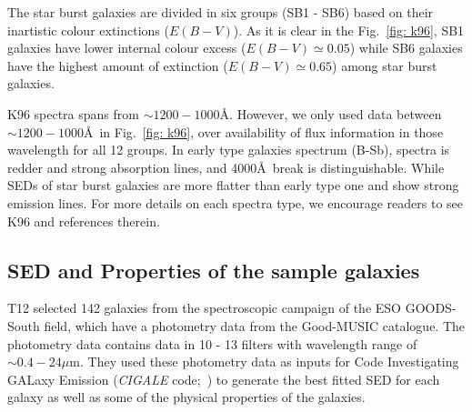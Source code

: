     The star burst galaxies are divided in six groups (SB1 - SB6) based on their inartistic colour extinctions ($E(B-V)$). 
    As it is clear in the Fig.~\ref{fig: k96}, SB1 galaxies have lower internal colour excess ($E(B-V) \simeq 0.05$) while SB6 galaxies have the highest amount of extinction ($E(B-V) \simeq 0.65$) among star burst galaxies.
    
    K96 spectra spans from $\sim1200-1000$\AA. %
    However, we only used data between $\sim1200-1000$\AA~in Fig.~\ref{fig: k96}, over availability of flux information in those wavelength for all 12 groups.
    In early type galaxies spectrum (B-Sb), spectra is redder and strong absorption lines, and 4000\AA~break is distinguishable. 
    While SEDs of star burst galaxies are more flatter than early type one and show strong emission lines.
    For more details on each spectra type, we encourage readers to see K96 and references therein. 
    

 \subsection{SED and Properties of the sample galaxies}
    T12 selected 142 galaxies from the spectroscopic campaign of the ESO GOODS-South field, which have a photometry data from the Good-MUSIC catalogue. %
    The photometry data contains data in 10 - 13 filters with wavelength range of $\sim 0.4-24 \mu$m. %
    They used these photometry data as inputs for Code Investigating GALaxy Emission ({\em CIGALE} code;~\citep{Noll09}) to generate the best fitted SED for each galaxy as well as some of the physical properties of the galaxies.
    
